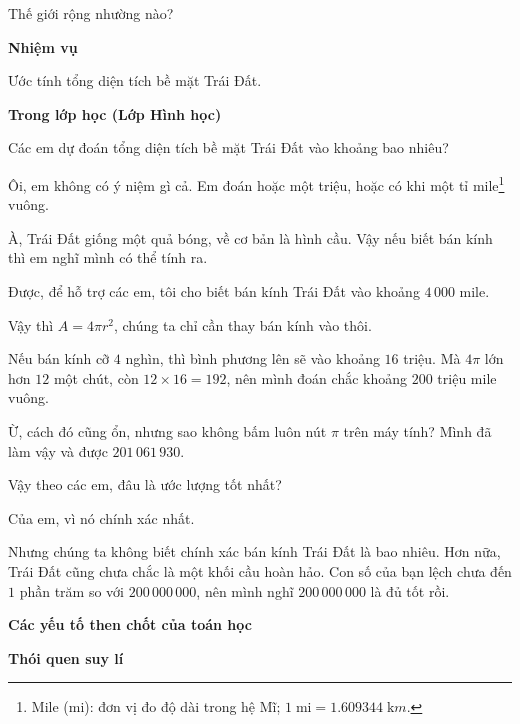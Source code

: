   {Thế giới rộng nhường nào?}
  {
    \textbf{Nhiệm vụ}

    Ước tính tổng diện tích bề mặt Trái Đất.

    \textbf{Trong lớp học (Lớp Hình học)}

    \begin{scriptlist}
    \item [Giáo viên:] Các em dự đoán tổng diện tích bề mặt Trái Đất vào khoảng bao nhiêu?

    \item [Học sinh 1:] Ôi, em không có ý niệm gì cả. Em đoán hoặc một triệu, hoặc có khi một tỉ mile\footnote{Mile (mi): đơn vị đo độ dài trong hệ Mĩ; $1\;\text{mi}= 1.609344\;\text{k}m$.} vuông.

    \item [Học sinh 2:] À, Trái Đất giống một quả bóng, về cơ bản là hình cầu. Vậy nếu biết bán kính thì em nghĩ mình có thể tính ra.

    \item [Giáo viên:] Được, để hỗ trợ các em, tôi cho biết bán kính Trái Đất vào khoảng $4\,000$ mile.

    \item [Học sinh 2:] Vậy thì $A = 4\pi r^2$, chúng ta chỉ cần thay bán kính vào thôi.

    \item [Học sinh 3:] Nếu bán kính cỡ $4$ nghìn, thì bình phương lên sẽ vào khoảng $16$ triệu. Mà $4\pi$ lớn hơn $12$ một chút, còn $12 \times 16 = 192$, nên mình đoán chắc khoảng $200$ triệu mile vuông.

    \item [Học sinh 4:] Ừ, cách đó cũng ổn, nhưng sao không bấm luôn nút $\pi$ trên máy tính? Mình đã làm vậy và được $201\,061\,930$.

    \item [Giáo viên:] Vậy theo các em, đâu là ước lượng tốt nhất?

    \item [Học sinh 4:] Của em, vì nó chính xác nhất.

    \item [Học sinh 3:] Nhưng chúng ta không biết chính xác bán kính Trái Đất là bao nhiêu. Hơn nữa, Trái Đất cũng chưa chắc là một khối cầu hoàn hảo. Con số của bạn lệch chưa đến $1$ phần trăm so với $200\,000\,000$, nên mình nghĩ $200\,000\,000$ là đủ tốt rồi.
    \end{scriptlist}

    \textbf{Các yếu tố then chốt của toán học}

    \begin{hanglist}
    \end{hanglist}\vspace{\baselineskip}

    \textbf{Thói quen suy lí}

    \begin{hanglist}

    \end{hanglist}
  }
